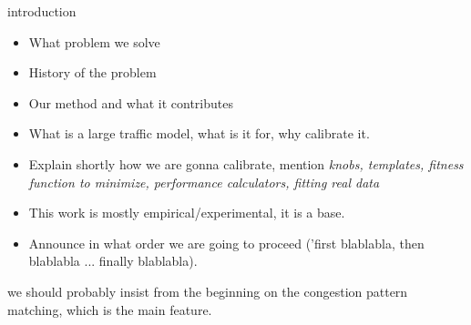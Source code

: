  introduction\\
\begin{itemize}
	\item What problem we solve
	\item History of the problem
	\item Our method and what it contributes
\end{itemize}

\color{red}
\begin{itemize}
	\item What is a large traffic model, what is it for, why calibrate it.
	\item Explain shortly how we are gonna calibrate, mention \emph{knobs, templates, fitness function to minimize, performance calculators, fitting real data}
	\item This work is mostly empirical/experimental, it is a base.
	\item Announce in what order we are going to proceed ('first blablabla, then blablabla ... finally blablabla).
\end{itemize}
we should probably insist from the beginning on the congestion pattern matching, which is the main feature.
\color{black}
	
